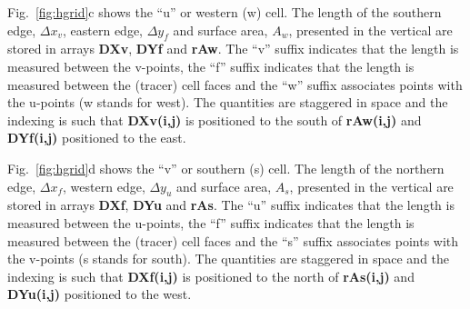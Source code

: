Fig.~\ref{fig:hgrid}c shows the ``u'' or western (w) cell. The length of
the southern edge, $\Delta x_v$, eastern edge, $\Delta y_f$ and
surface area, $A_w$, presented in the vertical are stored in arrays
{\bf DXv}, {\bf DYf} and {\bf rAw}. 
The ``v'' suffix indicates that the length is measured between the
v-points, the ``f'' suffix indicates that the length is measured
between the (tracer) cell faces and the ``w'' suffix associates points
with the u-points (w stands for west). The quantities are staggered in
space and the indexing is such that {\bf DXv(i,j)} is positioned to
the south of {\bf rAw(i,j)} and {\bf DYf(i,j)} positioned to the east.

Fig.~\ref{fig:hgrid}d shows the ``v'' or southern (s) cell. The length of
the northern edge, $\Delta x_f$, western edge, $\Delta y_u$ and
surface area, $A_s$, presented in the vertical are stored in arrays
{\bf DXf}, {\bf DYu} and {\bf rAs}. 
The ``u'' suffix indicates that the length is measured between the
u-points, the ``f'' suffix indicates that the length is measured
between the (tracer) cell faces and the ``s'' suffix associates points
with the v-points (s stands for south). The quantities are staggered
in space and the indexing is such that {\bf DXf(i,j)} is positioned to
the north of {\bf rAs(i,j)} and {\bf DYu(i,j)} positioned to the west.


